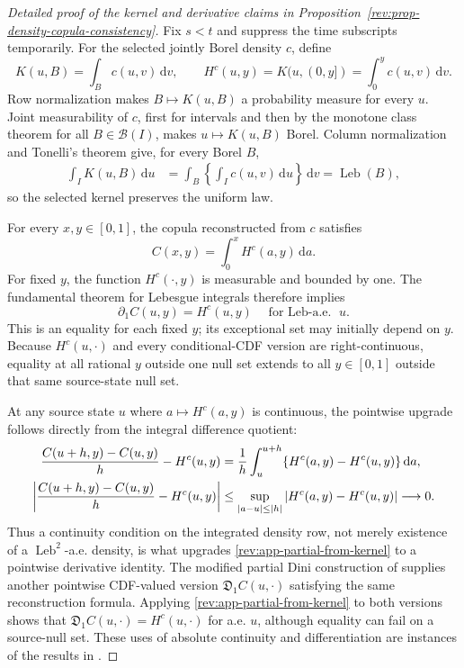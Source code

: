 \documentclass[11pt]{article}
\theoremstyle{remark}
\newcommand{\dd}{\,\mathrm d}
\newcommand{\Leb}{\operatorname{Leb}}
\begin{document}
\begin{proof}[Detailed proof of the kernel and derivative claims in
Proposition~\ref{rev:prop-density-copula-consistency}]
Fix $s<t$ and suppress the time subscripts temporarily.  For the selected
jointly Borel density $c$, define
\[
K(u,B)=\int_Bc(u,v)\dd v,
\qquad
H^c(u,y)=K(u,(0,y])=\int_0^yc(u,v)\dd v.
\]
Row normalization makes $B\mapsto K(u,B)$ a probability measure for every
$u$.  Joint measurability of $c$, first for intervals and then by the monotone
class theorem for all $B\in\mathcal B(I)$, makes $u\mapsto K(u,B)$ Borel.
Column normalization and Tonelli's theorem give, for every Borel $B$,
\begin{align}
\int_IK(u,B)\dd u
&=\int_B\left\{\int_Ic(u,v)\dd u\right\}\dd v
=\Leb(B),
\label{rev:app-kernel-invariance}
\end{align}
so the selected kernel preserves the uniform law.

For every $x,y\in[0,1]$, the copula reconstructed from $c$ satisfies
\begin{equation}
C(x,y)=\int_0^xH^c(a,y)\dd a.
\label{rev:app-copula-kernel-reconstruction}
\end{equation}
For fixed $y$, the function $H^c(\cdot,y)$ is measurable and bounded by one.
The fundamental theorem for Lebesgue integrals therefore implies
\begin{equation}
\partial_1C(u,y)=H^c(u,y)
\quad\text{for $\Leb$-a.e. }u.
\label{rev:app-partial-from-kernel}
\end{equation}
This is an equality for each fixed $y$; its exceptional set may initially
depend on $y$.  Because $H^c(u,\cdot)$ and every conditional-CDF version are
right-continuous, equality at all rational $y$ outside one null set extends to
all $y\in[0,1]$ outside that same source-state null set.

At any source state $u$ where $a\mapsto H^c(a,y)$ is continuous, the pointwise
upgrade follows directly from the integral difference quotient:
\begin{align}
\frac{C(u+h,y)-C(u,y)}{h}-H^c(u,y)
&=\frac1h\int_u^{u+h}\{H^c(a,y)-H^c(u,y)\}\dd a,\notag\\
\left|\frac{C(u+h,y)-C(u,y)}{h}-H^c(u,y)\right|
&\le \sup_{|a-u|\le |h|}|H^c(a,y)-H^c(u,y)|
\longrightarrow0.
\label{rev:app-pointwise-partial-upgrade}
\end{align}
Thus a continuity condition on the integrated density row, not merely existence
of a $\Leb^2$-a.e. density, is what upgrades
\eqref{rev:app-partial-from-kernel} to a pointwise derivative identity.  The
modified partial Dini construction of \citet{FangJiangLiuYang2020} supplies
another pointwise CDF-valued version $\mathfrak D_1C(u,\cdot)$ satisfying the
same reconstruction formula.  Applying
\eqref{rev:app-partial-from-kernel} to both versions shows that
$\mathfrak D_1C(u,\cdot)=H^c(u,\cdot)$ for a.e. $u$, although equality can fail
on a source-null set.  These uses of absolute continuity and differentiation
are instances of the results in \citet[Chapter~3]{Folland1999}.


\end{proof}
\end{document}
